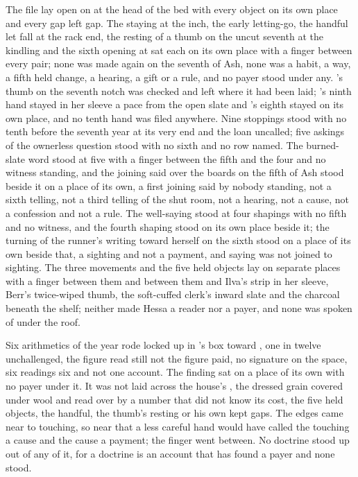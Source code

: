 The file lay open on  at the head of the bed with every object on its own place and every gap left gap. The staying at the inch, the early letting-go, the handful let fall at the rack end, the resting of a thumb on the uncut seventh at the kindling and the sixth opening at  sat each on its own place with a finger between every pair; none was made again on the seventh of Ash, none was a habit, a way, a fifth held change, a hearing, a gift or a rule, and no payer stood under any. 's thumb on the seventh notch was checked and left where it had been laid; 's ninth hand stayed in her sleeve a pace from the open slate and 's eighth stayed on its own place, and no tenth hand was filed anywhere. Nine stoppings stood with no tenth before the seventh year at its very end and the loan uncalled; five askings of the ownerless question stood with no sixth and no row named. The burned-slate word stood at five with a finger between the fifth and the four and no witness standing, and the joining said over the boards on the fifth of Ash stood beside it on a place of its own, a first joining said by nobody standing, not a sixth telling, not a third telling of the shut room, not a hearing, not a cause, not a confession and not a rule. The well-saying stood at four shapings with no fifth and no witness, and the fourth shaping stood on its own place beside it; the turning of the runner's writing toward herself on the sixth stood on a place of its own beside that, a sighting and not a payment, and saying was not joined to sighting. The three movements and the five held objects lay on separate places with a finger between them and between them and Ilva's strip in her sleeve, Berr's twice-wiped thumb, the soft-cuffed clerk's inward slate and the charcoal beneath the shelf; neither made Hessa a reader nor  a payer, and none was spoken of under the roof.

Six arithmetics of the year rode locked up  in 's box toward , one in twelve unchallenged, the figure read still not the figure paid, no signature on the space, six readings six and not one account. The finding sat on a place of its own with no payer under it. It was not laid across the house's , the dressed grain covered under wool and read over by a number that did not know its cost, the five held objects, the handful, the thumb's resting or his own kept gaps. The edges came near to touching, so near that a less careful hand would have called the touching a cause and the cause a payment; the finger went between. No doctrine stood up out of any of it, for a doctrine is an account that has found a payer and none stood.

